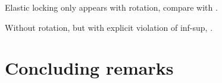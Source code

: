 Elastic locking only appears with rotation, compare 
with .


Without rotation, but with explicit violation of inf-sup,
.


\section*{Concluding remarks}



\acks






